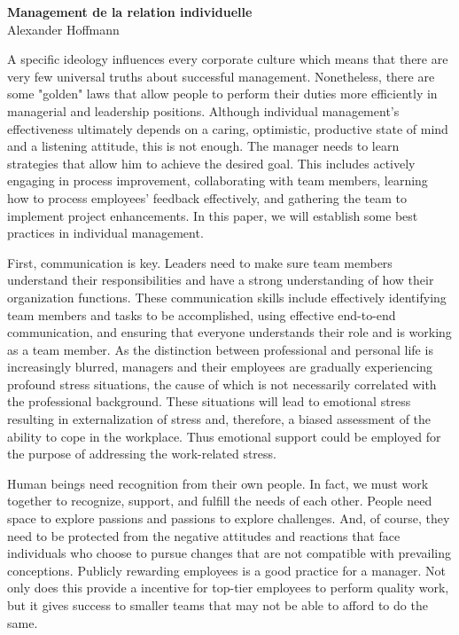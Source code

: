 \documentclass[12pt, french]{article}
\begin{document}
\begin{center}
\textbf{Management de la relation individuelle}\\
Alexander Hoffmann\\
\end{center}

A specific ideology influences every corporate culture which means that there are very few universal truths about successful management. Nonetheless, there are some "golden" laws that allow people to perform their duties more efficiently in managerial and leadership positions. Although individual management's effectiveness ultimately depends on a caring, optimistic, productive state of mind and a listening attitude, this is not enough. The manager needs to learn strategies that allow him to achieve the desired goal. This includes actively engaging in process improvement, collaborating with team members, learning how to process employees' feedback effectively, and gathering the team to implement project enhancements. In this paper, we will establish some best practices in individual management.

First, communication is key. Leaders need to make sure team members understand their responsibilities and have a strong understanding of how their organization functions. These communication skills include effectively identifying team members and tasks to be accomplished, using effective end-to-end communication, and ensuring that everyone understands their role and is working as a team member. As the distinction between professional and personal life is increasingly blurred, managers and their employees are gradually experiencing profound stress situations, the cause of which is not necessarily correlated with the professional background. These situations will lead to emotional stress resulting in externalization of stress and, therefore, a biased assessment of the ability to cope in the workplace. Thus emotional support could be employed for the purpose of addressing the work-related stress.

Human beings need recognition from their own people. In fact, we must work together to recognize, support, and fulfill the needs of each other. People need space to explore passions and passions to explore challenges. And, of course, they need to be protected from the negative attitudes and reactions that face individuals who choose to pursue changes that are not compatible with prevailing conceptions. Publicly rewarding employees is a good practice for a manager. Not only does this provide a incentive for top-tier employees to perform quality work, but it gives success to smaller teams that may not be able to afford to do the same.
\end{document}
